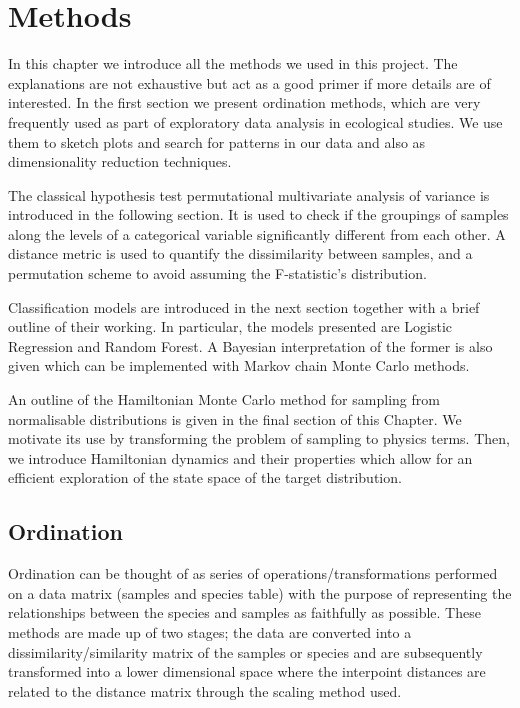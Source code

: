 
\chapter{Methods}

\ifpdf
    \graphicspath{{Chapter2/Figs/Raster/}{Chapter2/Figs/PDF/}{Chapter2/Figs/}}
\else
    \graphicspath{{Chapter2/Figs/Vector/}{Chapter2/Figs/}}
\fi
In this chapter we introduce all the methods we used in this project. The explanations are not exhaustive but act as a good primer if more details are of interested.
In the first section we present ordination methods, which are very frequently used as part of exploratory data analysis in ecological studies. We use them to sketch plots and search for patterns in our data and also as dimensionality reduction techniques.

The classical hypothesis test permutational multivariate analysis of variance is introduced in the following section. It is used to check if the groupings of samples along the levels of a categorical variable significantly different from each other. A distance metric is used to quantify the dissimilarity between samples, and a permutation scheme to avoid assuming the F-statistic's distribution. 

Classification models are introduced in the next section together with a brief outline of their working. In particular, the models presented are Logistic Regression and Random Forest. A Bayesian interpretation of the former is also given which can be implemented with Markov chain Monte Carlo methods.  

An outline of the Hamiltonian Monte Carlo method for sampling from normalisable distributions is given in the final section of this Chapter. We motivate its use by transforming the problem of sampling to physics terms. Then, we introduce Hamiltonian dynamics and their properties which allow for an efficient exploration of the state space of the target distribution.

\section{Ordination}
\label{sec:ordination}
Ordination can be thought of as series of operations/transformations performed on a data matrix (samples and species table) with the purpose of representing the relationships between the species and samples as faithfully as possible. These methods are made up of two stages; the data are converted into a dissimilarity/similarity matrix of the samples or species and are subsequently transformed into a lower dimensional space where the interpoint distances are related to the distance matrix through the scaling method used.

